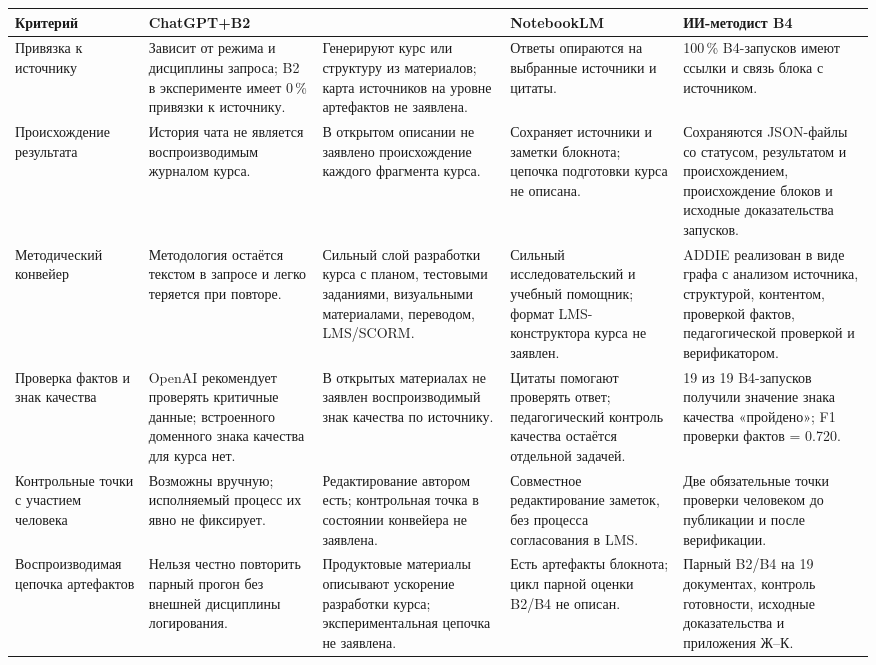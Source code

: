 \begin{center}
  \label{tab:uniqueness-defense}
  \scriptsize
  \setlength{\tabcolsep}{2pt}
  \renewcommand{\arraystretch}{1.12}
  \begin{tabular}{|P{2.45cm}|P{2.75cm}|P{2.85cm}|P{2.65cm}|P{3.35cm}|}
  \hline
  \textbf{Критерий}
    & \textbf{ChatGPT+B2}
    & 
    & \textbf{NotebookLM}
    & \textbf{ИИ-методист B4} \\
  \hline
  Привязка к источнику
    & Зависит от режима и дисциплины запроса; B2 в эксперименте имеет 0\,\% привязки к источнику.
    & Генерируют курс или структуру из материалов; карта источников на уровне артефактов не заявлена.
    & Ответы опираются на выбранные источники и цитаты.
    & 100\,\% B4-запусков имеют ссылки и связь блока с источником. \\
  \hline
  Происхождение результата
    & История чата не является воспроизводимым журналом курса.
    & В открытом описании не заявлено происхождение каждого фрагмента курса.
    & Сохраняет источники и заметки блокнота; цепочка подготовки курса не описана.
    & Сохраняются JSON-файлы со статусом, результатом и происхождением,
      происхождение блоков и исходные доказательства запусков. \\
  \hline
  Методический конвейер
    & Методология остаётся текстом в запросе и легко теряется при повторе.
    & Сильный слой разработки курса с планом, тестовыми заданиями, визуальными материалами, переводом, LMS/SCORM.
    & Сильный исследовательский и учебный помощник; формат LMS-конструктора курса не заявлен.
    & ADDIE реализован в виде графа с анализом источника, структурой, контентом, проверкой фактов, педагогической проверкой и верификатором. \\
  \hline
  Проверка фактов и знак качества
    & OpenAI рекомендует проверять критичные данные; встроенного доменного знака качества для курса нет.
    & В открытых материалах не заявлен воспроизводимый знак качества по источнику.
    & Цитаты помогают проверять ответ; педагогический контроль качества остаётся отдельной задачей.
    & 19 из 19 B4-запусков получили значение знака качества «пройдено»; F1 проверки фактов = 0.720. \\
  \hline
  Контрольные точки с участием человека
    & Возможны вручную; исполняемый процесс их явно не фиксирует.
    & Редактирование автором есть; контрольная точка в состоянии конвейера не заявлена.
    & Совместное редактирование заметок, без процесса согласования в LMS.
    & Две обязательные точки проверки человеком до публикации и после верификации. \\
  \hline
  Воспроизводимая цепочка артефактов
    & Нельзя честно повторить парный прогон без внешней дисциплины логирования.
    & Продуктовые материалы описывают ускорение разработки курса; экспериментальная цепочка не заявлена.
    & Есть артефакты блокнота; цикл парной оценки B2/B4 не описан.
    & Парный B2/B4 на 19 документах, контроль готовности, исходные доказательства и приложения Ж–К. \\
  \hline
  \end{tabular}
\end{center}


